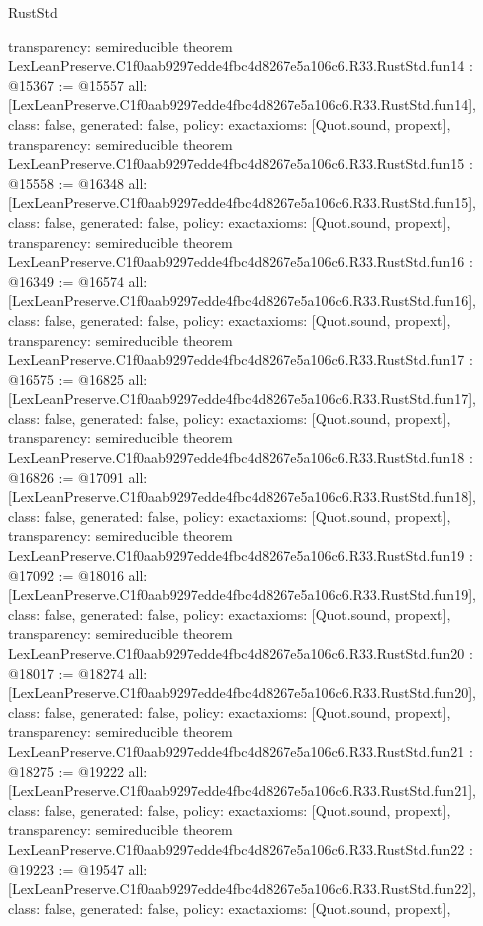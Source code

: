 \begin{lexlean}{RustStd}
\begin{coremodule}
{  transparency: semireducible
}
theorem LexLeanPreserve.C1f0aab9297edde4fbc4d8267e5a106c6.R33.RustStd.fun14 : @15367 := @15557 {
  all: [LexLeanPreserve.C1f0aab9297edde4fbc4d8267e5a106c6.R33.RustStd.fun14],
  class: false,
  generated: false,
  policy: exact{axioms: [Quot.sound, propext]},
  transparency: semireducible
}
theorem LexLeanPreserve.C1f0aab9297edde4fbc4d8267e5a106c6.R33.RustStd.fun15 : @15558 := @16348 {
  all: [LexLeanPreserve.C1f0aab9297edde4fbc4d8267e5a106c6.R33.RustStd.fun15],
  class: false,
  generated: false,
  policy: exact{axioms: [Quot.sound, propext]},
  transparency: semireducible
}
theorem LexLeanPreserve.C1f0aab9297edde4fbc4d8267e5a106c6.R33.RustStd.fun16 : @16349 := @16574 {
  all: [LexLeanPreserve.C1f0aab9297edde4fbc4d8267e5a106c6.R33.RustStd.fun16],
  class: false,
  generated: false,
  policy: exact{axioms: [Quot.sound, propext]},
  transparency: semireducible
}
theorem LexLeanPreserve.C1f0aab9297edde4fbc4d8267e5a106c6.R33.RustStd.fun17 : @16575 := @16825 {
  all: [LexLeanPreserve.C1f0aab9297edde4fbc4d8267e5a106c6.R33.RustStd.fun17],
  class: false,
  generated: false,
  policy: exact{axioms: [Quot.sound, propext]},
  transparency: semireducible
}
theorem LexLeanPreserve.C1f0aab9297edde4fbc4d8267e5a106c6.R33.RustStd.fun18 : @16826 := @17091 {
  all: [LexLeanPreserve.C1f0aab9297edde4fbc4d8267e5a106c6.R33.RustStd.fun18],
  class: false,
  generated: false,
  policy: exact{axioms: [Quot.sound, propext]},
  transparency: semireducible
}
theorem LexLeanPreserve.C1f0aab9297edde4fbc4d8267e5a106c6.R33.RustStd.fun19 : @17092 := @18016 {
  all: [LexLeanPreserve.C1f0aab9297edde4fbc4d8267e5a106c6.R33.RustStd.fun19],
  class: false,
  generated: false,
  policy: exact{axioms: [Quot.sound, propext]},
  transparency: semireducible
}
theorem LexLeanPreserve.C1f0aab9297edde4fbc4d8267e5a106c6.R33.RustStd.fun20 : @18017 := @18274 {
  all: [LexLeanPreserve.C1f0aab9297edde4fbc4d8267e5a106c6.R33.RustStd.fun20],
  class: false,
  generated: false,
  policy: exact{axioms: [Quot.sound, propext]},
  transparency: semireducible
}
theorem LexLeanPreserve.C1f0aab9297edde4fbc4d8267e5a106c6.R33.RustStd.fun21 : @18275 := @19222 {
  all: [LexLeanPreserve.C1f0aab9297edde4fbc4d8267e5a106c6.R33.RustStd.fun21],
  class: false,
  generated: false,
  policy: exact{axioms: [Quot.sound, propext]},
  transparency: semireducible
}
theorem LexLeanPreserve.C1f0aab9297edde4fbc4d8267e5a106c6.R33.RustStd.fun22 : @19223 := @19547 {
  all: [LexLeanPreserve.C1f0aab9297edde4fbc4d8267e5a106c6.R33.RustStd.fun22],
  class: false,
  generated: false,
  policy: exact{axioms: [Quot.sound, propext]},
}
\end{coremodule}
\end{lexlean}
